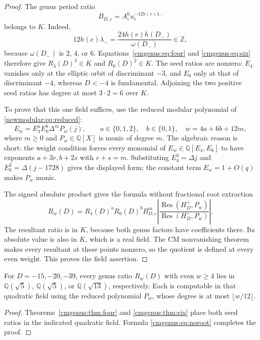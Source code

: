 \begin{proof}
The genus period ratio
\[
 B_{D,\varepsilon}=A_\varepsilon^6
              u_e^{-12h(e)\lambda_-}
\]
belongs to $K$. Indeed,
\[
 12h(e)\lambda_-=
 \frac{24h(e)h(D_-)}{\omega(D_-)}\in\mathbb Z,
\]
because $\omega(D_-)$ is $2$, $4$, or $6$.
Equations~\eqref{cmgenus:eq:four} and \eqref{cmgenus:eq:six} therefore
give $R_4(D)^3\in K$ and $R_6(D)^2\in K$.
The seed ratios are nonzero: $E_4$ vanishes only at the elliptic orbit
of discriminant $-3$, and $E_6$ only at that of discriminant $-4$,
whereas $D<-4$ is fundamental. Adjoining the two positive seed ratios
has degree at most $3\cdot2=6$ over $K$.

To prove that this one field suffices, use the reduced modular
polynomial of \eqref{newmodular:eq:reduced}:
\begin{equation}
 E_w=E_4^aE_6^b\Delta^m P_w(j),\qquad
 a\in\{0,1,2\},\quad b\in\{0,1\},\quad
 w=4a+6b+12m,
 \label{cmgenus:eq:smallpolynomial}
\end{equation}
where $m\geq0$ and $P_w\in\mathbb Q[X]$ is monic of degree $m$.
The algebraic reason is short: the weight condition forces every
monomial of $E_w\in\mathbb Q[E_4,E_6]$ to have exponents
$a+3r,b+2s$ with $r+s=m$. Substituting
$E_4^3=\Delta j$ and $E_6^2=\Delta(j-1728)$ gives the displayed
form; the constant term $E_w=1+O(q)$ makes $P_w$ monic.

The signed absolute product gives the formula without fractional
root extraction
\begin{equation}
 R_w(D)=R_4(D)^aR_6(D)^b B_{D,\varepsilon}^{m}
       \left|\frac{\operatorname{Res}(H_D^+,P_w)}
                    {\operatorname{Res}(H_D^-,P_w)}\right|.
 \label{cmgenus:eq:noroot}
\end{equation}
The resultant ratio is in $K$, because both genus factors have
coefficients there. Its absolute value is also in $K$, which is a
real field. The CM nonvanishing theorem makes every resultant at these points
nonzero, so the quotient is defined at every even weight. This proves the field assertion.
\end{proof}

\begin{corollary}
\label{cmgenus:cor:closure}
For $D=-15,-20,-39$, every genus ratio $R_w(D)$ with even
$w\geq4$ lies in $\mathbb Q(\sqrt5)$, $\mathbb Q(\sqrt5)$, or
$\mathbb Q(\sqrt{13})$, respectively. Each is computable in that
quadratic field using the reduced polynomial $P_w$, whose degree
is at most $\lfloor w/12\rfloor$.
\end{corollary}
\begin{proof}
Theorems~\ref{cmgenus:thm:four} and \ref{cmgenus:thm:six} place both
seed ratios in the indicated quadratic field. Formula
\eqref{cmgenus:eq:noroot} completes the proof.
\end{proof}

